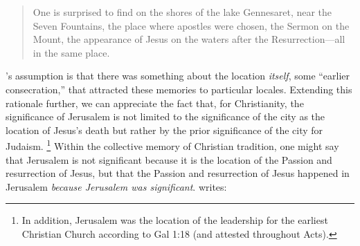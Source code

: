 \begin{quote}
    One is surprised to find on the shores of the lake Gennesaret, near the Seven Fountains, the place where apostles were chosen, the Sermon on the Mount, the appearance of Jesus on the waters after the Resurrection---all in the same place.%
        \autocite[220]{halbwachs1992}
\end{quote}  
\noindent
\halbwachs's assumption is that there was something about the location \emph{itself}, some ``earlier consecration,''%
    \autocite[220]{halbwachs1992}
that attracted these memories to particular locales. Extending this rationale further, we can appreciate the fact that, for Christianity, the significance of Jerusalem is not limited to the significance of the city as the location of Jesus's death but rather by the prior significance of the city for Judaism.%
    \footnote{%
        In addition, Jerusalem was the location of the leadership for the earliest Christian Church according to Gal 1:18 (and attested throughout Acts).}
%
Within the collective memory of Christian tradition, one might say that Jerusalem is not significant because it is the location of the Passion and resurrection of Jesus, but that the Passion and resurrection of Jesus happened in Jerusalem \emph{because Jerusalem was significant}. \halbwachs writes:  

